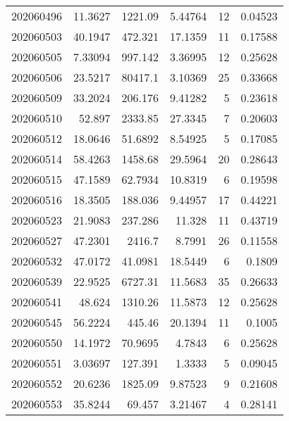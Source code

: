 \begin{tabular}{rrrrrr}
 202060496 &         11.3627  &     1221.09   &            5.44764 &          12 & 0.04523 \\
 202060503 &         40.1947  &      472.321  &           17.1359  &          11 & 0.17588 \\
 202060505 &          7.33094 &      997.142  &            3.36995 &          12 & 0.25628 \\
 202060506 &         23.5217  &    80417.1    &            3.10369 &          25 & 0.33668 \\
 202060509 &         33.2024  &      206.176  &            9.41282 &           5 & 0.23618 \\
 202060510 &         52.897   &     2333.85   &           27.3345  &           7 & 0.20603 \\
 202060512 &         18.0646  &       51.6892 &            8.54925 &           5 & 0.17085 \\
 202060514 &         58.4263  &     1458.68   &           29.5964  &          20 & 0.28643 \\
 202060515 &         47.1589  &       62.7934 &           10.8319  &           6 & 0.19598 \\
 202060516 &         18.3505  &      188.036  &            9.44957 &          17 & 0.44221 \\
 202060523 &         21.9083  &      237.286  &           11.328   &          11 & 0.43719 \\
 202060527 &         47.2301  &     2416.7    &            8.7991  &          26 & 0.11558 \\
 202060532 &         47.0172  &       41.0981 &           18.5449  &           6 & 0.1809  \\
 202060539 &         22.9525  &     6727.31   &           11.5683  &          35 & 0.26633 \\
 202060541 &         48.624   &     1310.26   &           11.5873  &          12 & 0.25628 \\
 202060545 &         56.2224  &      445.46   &           20.1394  &          11 & 0.1005  \\
 202060550 &         14.1972  &       70.9695 &            4.7843  &           6 & 0.25628 \\
 202060551 &          3.03697 &      127.391  &            1.3333  &           5 & 0.09045 \\
 202060552 &         20.6236  &     1825.09   &            9.87523 &           9 & 0.21608 \\
 202060553 &         35.8244  &       69.457  &            3.21467 &           4 & 0.28141 \\

\end{tabular}

